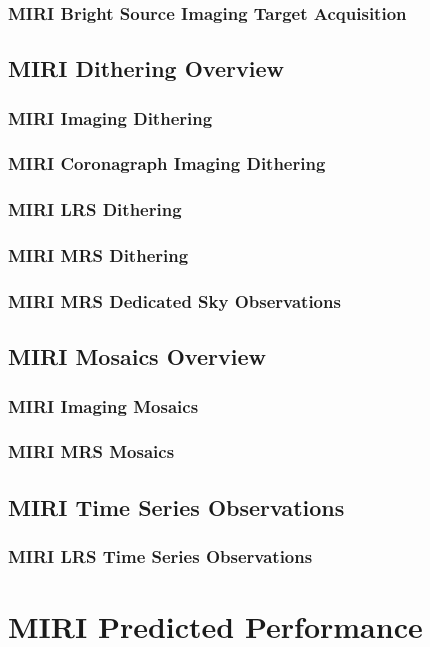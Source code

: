 \subsubsection{MIRI Bright Source Imaging Target Acquisition}

\subsection{MIRI Dithering Overview}
\subsubsection{MIRI Imaging Dithering}
\subsubsection{MIRI Coronagraph Imaging Dithering}
\subsubsection{MIRI LRS Dithering}
\subsubsection{MIRI MRS Dithering}
\subsubsection{MIRI MRS Dedicated Sky Observations}

\subsection{MIRI Mosaics Overview}
\subsubsection{MIRI Imaging Mosaics}
\subsubsection{MIRI MRS Mosaics}

\subsection{MIRI Time Series Observations}
\subsubsection{MIRI LRS Time Series Observations}

\section{MIRI Predicted Performance}
